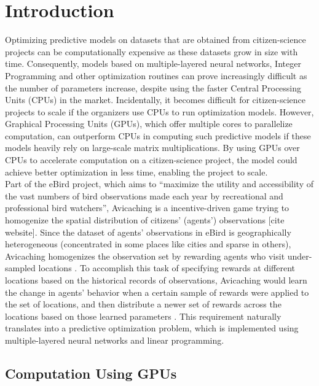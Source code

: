 \documentclass[12pt]{article}
\begin{document}
    \tableofcontents
    \listoftables
    \listoffigures
    \section{Introduction} \label{sec:Introduction}
    Optimizing predictive models on datasets that are obtained from citizen-science projects can be computationally expensive as these datasets grow in size with time. Consequently, models based on multiple-layered neural networks, Integer Programming and other optimization routines can prove increasingly difficult as the number of parameters increase, despite using the faster Central Processing Units (CPUs) in the market. Incidentally, it becomes difficult for citizen-science projects to scale if the organizers use CPUs to run optimization models. However, Graphical Processing Units (GPUs), which offer multiple cores to parallelize computation, can outperform CPUs in computing such predictive models if these models heavily rely on large-scale matrix multiplications. By using GPUs over CPUs to accelerate computation on a citizen-science project, the model could achieve better optimization in less time, enabling the project to scale.\\
    
    Part of the eBird project, which aims to ``maximize the utility and accessibility of the vast numbers of bird observations made each year by recreational and professional bird watchers'', Avicaching is a incentive-driven game trying to homogenize the spatial distribution of citizens' (agents') observations [cite website]. Since the dataset of agents' observations in eBird is geographically heterogeneous (concentrated in some places like cities and sparse in others), Avicaching homogenizes the observation set by rewarding agents who visit under-sampled locations \cite{Xue2016Avi1}. To accomplish this task of specifying rewards at different locations based on the historical records of observations, Avicaching would learn the change in agents' behavior when a certain sample of rewards were applied to the set of locations, and then distribute a newer set of rewards across the locations based on those learned parameters \cite{Xue2016Avi2}. This requirement naturally translates into a predictive optimization problem, which is implemented using multiple-layered neural networks and linear programming.

    \subsection{Computation Using GPUs} \label{sec:comp_using_GPUs}
    
\end{document}
